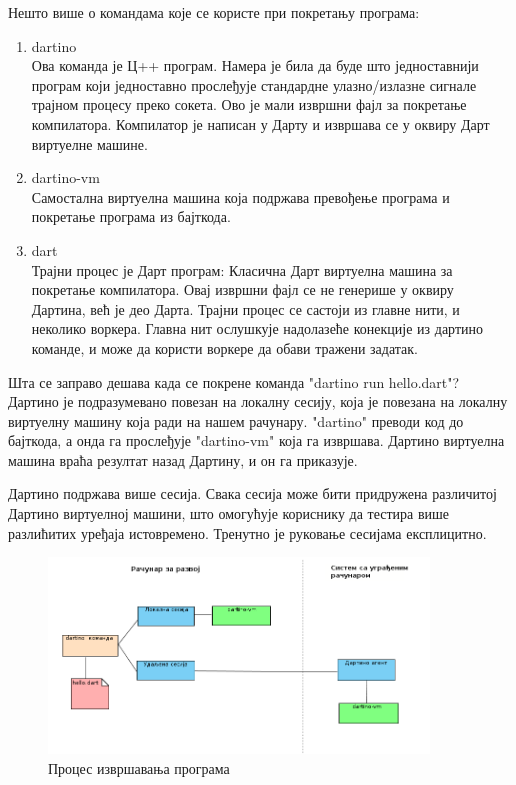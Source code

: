 \documentclass[12pt,oneside]{memoir}
\begin{document}
Нешто више о командама које се користе при покретању програма:
\begin{enumerate}
\item dartino\\
Ова команда је Ц++ програм. Намера је била да буде што једноставнији програм који једноставно прослеђује стандардне улазно/излазне сигнале трајном процесу преко сокета. Ово је мали извршни фајл за покретање компилатора. Компилатор је написан у Дарту и извршава се у оквиру Дарт виртуелне машине. 
\item dartino-vm \\
Самостална виртуелна машина која подржава превођење програма и покретање програма из бајткода.
\item dart \\
Трајни процес је Дарт програм: Класична Дарт виртуелна машина за покретање компилатора. Овај извршни фајл се не генерише у оквиру Дартина, већ је део Дарта. Трајни процес се састоји из главне нити, и неколико воркера. Главна нит ослушкује надолазеће конекције из дартино команде, и може да користи воркере да обави тражени задатак.
\end{enumerate}

Шта се заправо дешава када се покрене команда "dartino run hello.dart"? Дартино је подразумевано повезан на локалну сесију, која је повезана на локалну виртуелну машину која ради на нашем рачунару. "dartino" преводи код до бајткода, а онда га прослеђује "dartino-vm" која га извршава. Дартино виртуелна машина враћа резултат назад Дартину, и он га приказује.

Дартино подржава више сесија. Свака сесија може бити придружена различитој Дартино виртуелној машини, што омогућује кориснику да тестира више разлићитих уређаја истовремено. Тренутно је руковање сесијама експлицитно.

\begin{figure}[!ht]
  \centering
  \includegraphics[width=0.9\textwidth]{sesije.png}
  \caption{Процес извршавања програма}
  \label{fig:izvrsavanje}
\end{figure}
\end{document}
